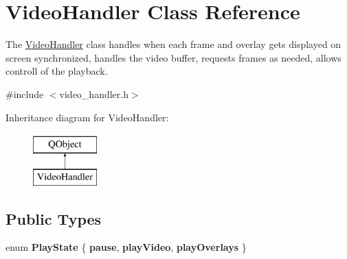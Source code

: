 \hypertarget{classVideoHandler}{}\section{Video\+Handler Class Reference}
\label{classVideoHandler}


The \hyperlink{classVideoHandler}{Video\+Handler} class handles when each frame and overlay gets displayed on screen synchronized, handles the video buffer, requests frames as needed, allows controll of the playback.  




{\ttfamily \#include $<$video\+\_\+handler.\+h$>$}

Inheritance diagram for Video\+Handler\+:\begin{figure}[H]
\begin{center}
\leavevmode
\includegraphics[height=2.000000cm]{classVideoHandler}
\end{center}
\end{figure}
\subsection*{Public Types}
\begin{DoxyCompactItemize}
\item 
enum {\bfseries Play\+State} \{ {\bfseries pause}, 
{\bfseries play\+Video}, 
{\bfseries play\+Overlays}
 \}\hypertarget{classVideoHandler_a2b1835a79f75fd56eadac477d3652b91}{}\label{classVideoHandler_a2b1835a79f75fd56eadac477d3652b91}

\end{DoxyCompactItemize}
